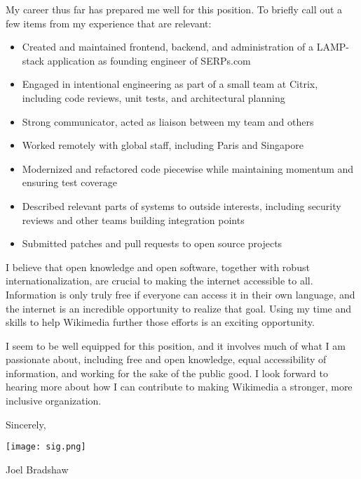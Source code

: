 \documentclass[letterpaper,12pt]{article}
\begin{document}
\begin{paracol}{2}
My career thus far has prepared me well for this position. To briefly call out a few items
from my experience that are relevant:
\begin{itemize}[nosep,topsep=-0.5em]
 \item Created and maintained frontend, backend, and administration of a LAMP-stack application as founding engineer of SERPs.com
 \item Engaged in intentional engineering as part of a small team at Citrix, including code reviews, unit tests,
       and architectural planning
 \item Strong communicator, acted as liaison between my team and others
 \item Worked remotely with global staff, including Paris and Singapore
 \item Modernized and refactored code piecewise while maintaining momentum and ensuring test coverage
 \item Described relevant parts of systems to outside interests, including security reviews and other
       teams building integration points
 \item Submitted patches and pull requests to open source projects
\end{itemize}
\vspace{0.5em}

I believe that open knowledge and open software, together with robust internationalization, are crucial
to making the internet accessible to all. Information is only truly free if everyone can access it in their own language,
and the internet is an incredible opportunity to realize that goal. Using my time and skills to help Wikimedia
further those efforts is an exciting opportunity.

I seem to be well equipped for this position, and it involves much of what I am passionate about, including
free and open knowledge, equal accessibility of information, and working for the sake of the public
good. I look forward to hearing more about how I can contribute to making Wikimedia a stronger, more
inclusive organization.

Sincerely,

\texttt{[image: sig.png]}

Joel Bradshaw

\flushpage
\end{paracol}
\end{document}
